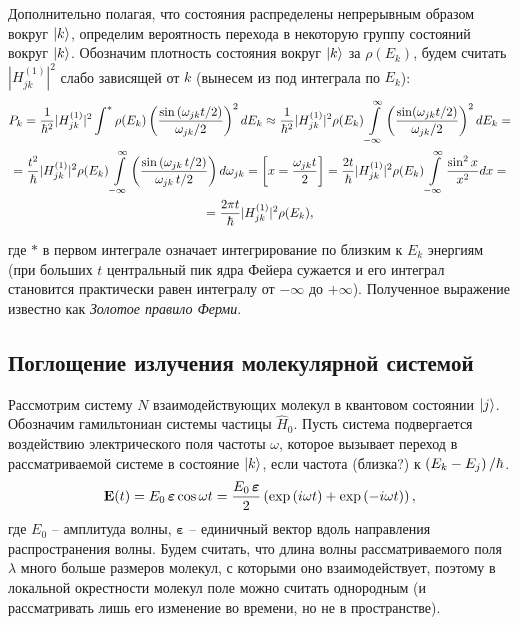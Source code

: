 Дополнительно полагая, что состояния распределены непрерывным образом вокруг $\ket{k}$, определим вероятность перехода в некоторую группу состояний вокруг $\ket{k}$. Обозначим плотность состояния вокруг $\ket{k}$ за $\rho (E_k)$, будем считать $|H_{jk}^{(1)}|^2$ слабо зависящей от $k$ (вынесем из под интеграла по $E_k$):
\vverh
\begin{gather}
	P_k = \frac{1}{\hbar^2} |H_{jk}^{(1)} |^2 \int^{*} \rho (E_k) \left( \frac{\sin \left( \omega_{jk} t / 2 \right)}{ \omega_{jk} / 2} \right) ^2 d E_k \approx \frac{1}{\hbar^2} | H_{jk}^{(1)} |^2\rho(E_k) \int\limits_{-\infty}^{\infty} \left( \frac{ \sin( \omega_{jk} t / 2)}{\omega_{jk} / 2} \right)^2 d E_k = \notag \\
		= \frac{t^2}{\hbar} | H_{jk}^{(1)} |^2 \rho(E_k) \int\limits_{-\infty}^{\infty} \left( \frac{\sin \left( \omega_{jk} \, t / 2 \right)}{\omega_{jk} \, t / 2}\right) d \omega_{jk} = \left[ x = \frac{\omega_{jk} t}{2} \right] = \frac{2 t}{\hbar} | H_{jk}^{(1)} |^2 \rho(E_k) \int\limits_{-\infty}^{\infty} \frac{\sin^2 x}{x^2} dx = \notag \\
		= \frac{2 \pi t}{\hbar} | H_{jk}^{(1)} |^2 \rho (E_k), \notag
\end{gather}

где $*$ в первом интеграле означает интегрирование по близким к $E_k$ энергиям (при больших $t$ центральный пик ядра Фейера сужается и его интеграл становится практически равен интегралу от $-\infty$ до $+\infty$). Полученное выражение известно как \textit{Золотое правило Ферми}.    

\subsection{Поглощение излучения молекулярной системой}

Рассмотрим систему $N$ взаимодействующих молекул в квантовом состоянии $\ket{j}$. Обозначим гамильтониан системы частицы $\hat{H}_0$. Пусть система подвергается воздействию электрического поля частоты $\omega$, которое вызывает переход в рассматриваемой системе в состояние $\ket{k}$, если частота (близка?) к $\left( E_k - E_j \right) / \hbar$. 
\vverh
\begin{gather}
	\mathbf{E}(t) = E_0 \, \boldsymbol{\varepsilon} \cos \omega t = \frac{E_0 \, \boldsymbol{\varepsilon}}{2} \left( \exp \left( i \omega t \right) + \exp \left( - i \omega t \right) \right) , \notag
\end{gather}
где $E_0$ -- амплитуда волны, $\boldsymbol{\varepsilon}$ -- единичный вектор вдоль направления распространения волны. Будем считать, что длина волны рассматриваемого поля $\lambda$ много больше размеров молекул, с которыми оно взаимодействует, поэтому в локальной окрестности молекул поле можно считать однородным (и рассматривать лишь его изменение во времени, но не в пространстве). 

